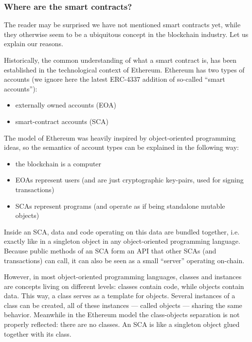 \documentclass[a4paper]{article}
\begin{document}
\subsubsection{Where are the smart contracts?}

The reader may be surprised we have not mentioned smart contracts yet, while they otherwise seem to be a ubiquitous concept in the blockchain industry. Let us explain our reasons.

Historically, the common understanding of what a smart contract is, has been established in the technological context of Ethereum. Ethereum has two types of accounts (we ignore here the latest ERC-4337 addition of so-called ``smart accounts''):

\begin{itemize}
  \item externally owned accounts (EOA)
  \item smart-contract accounts (SCA)
\end{itemize}

The model of Ethereum was heavily inspired by object-oriented programming ideas, so the semantics of account types can be explained in the following way:

\begin{itemize}
  \item the blockchain is a computer
  \item EOAs represent users (and are just cryptographic key-pairs, used for signing transactions)
  \item SCAs represent programs (and operate as if being standalone mutable objects)
\end{itemize}

Inside an SCA, data and code operating on this data are bundled together, i.e. exactly like in a singleton object in any object-oriented programming language. Because public methods of an SCA form an API that other SCAs (and transactions) can call, it can also be seen as a small ``server'' operating on-chain.

However, in most object-oriented programming languages, classes and instances are concepts living on different levels: classes contain code, while objects contain data. This way, a class serves as a template for objects. Several instances of a class can be created, all of these instances --- called objects --- sharing the same behavior. Meanwhile in the Ethereum model the class-objects separation is not properly reflected: there are no classes. An SCA is like a singleton object glued together with its class.
\end{document}
